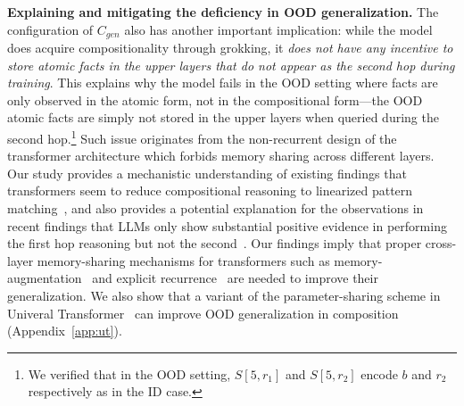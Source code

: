 \noindent\textbf{Explaining and mitigating the deficiency in OOD generalization.} The configuration of $C_{gen}$ also has another important implication: while the model does acquire compositionality through grokking, it \textit{does not have any incentive to store atomic facts in the upper layers that do not appear as the second hop during training}. This explains why the model fails in the OOD setting where facts are only observed in the atomic form, not in the compositional form---the OOD atomic facts are simply not stored in the upper layers when queried during the second hop.\footnote{We verified that in the OOD setting, $S[5,r_1]$ and $S[5,r_2]$ encode $b$ and $r_2$ respectively as in the ID case.} Such issue originates from the non-recurrent design of the transformer architecture which forbids memory sharing across different layers. Our study provides a mechanistic understanding of existing findings that transformers seem to reduce compositional reasoning to linearized pattern matching~\citep{dziri2023faith}, and also provides a potential explanation for the observations in recent findings that LLMs only show substantial positive evidence in performing the first hop reasoning but not the second~\citep{yang2024large}. Our findings imply that proper cross-layer memory-sharing mechanisms for transformers such as memory-augmentation~\citep{sukhbaatar2015end, graves2016hybrid} and explicit recurrence~\citep{dehghani2018universal, hutchins2022blockrecurrent, tan-etal-2023-sparse} are needed to improve their generalization. We also show that a variant of the parameter-sharing scheme in Univeral Transformer~\citep{dehghani2018universal} can improve OOD generalization in composition (Appendix~\ref{app:ut}).